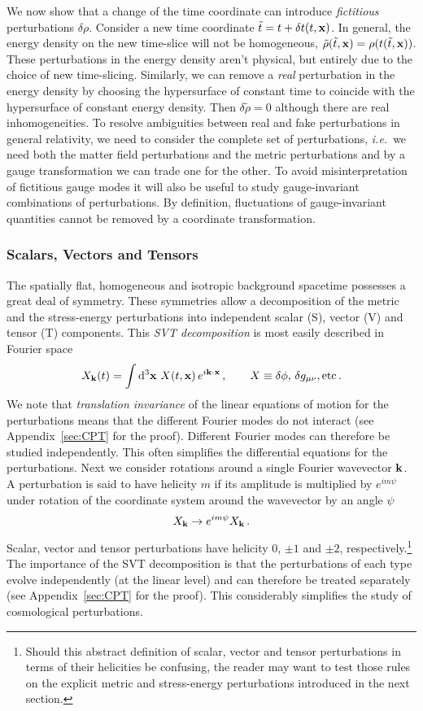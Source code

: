 \documentclass[12pt,letterpaper,rotate]{article}
\def\beq{\begin{equation}}
\def\eeq{\end{equation}}
\def\d{{\rm d}}
\begin{document}
{We now show that a change of the time coordinate can introduce {\it fictitious} perturbations $\delta \rho$. Consider a new time coordinate $\tilde t = t + \delta t(t, {\bf x})$. In general, the energy density on the new time-slice will not be homogeneous, $\tilde \rho(\tilde t, {\bf x})= \rho(t(\tilde t, {\bf x}))$. These perturbations in the energy density aren't physical, but entirely due to the choice of new time-slicing.
Similarly, we can remove a {\it real} perturbation in the energy density by choosing the hypersurface of constant time to coincide with the hypersurface of constant energy density. Then $\delta \tilde \rho=0$ although there are real inhomogeneities.
To resolve ambiguities between real and fake perturbations in general relativity, we need to consider the complete set of perturbations, {\it i.e.}~we need both the matter field perturbations and the metric perturbations and by a gauge transformation we can trade one for the other.
To avoid misinterpretation of fictitious gauge modes it will also be useful to study
 gauge-invariant combinations of perturbations. By definition, fluctuations of gauge-invariant quantities cannot be removed by a coordinate transformation.


\subsubsection{Scalars, Vectors and Tensors}
The spatially flat, homogeneous and isotropic background spacetime possesses a great deal of symmetry. These
symmetries allow a decomposition of the metric and the stress-energy perturbations 
into independent scalar (S), vector (V) and tensor (T) components. This {\it SVT decomposition} is most easily described in
Fourier space \beq
 X_{\bf k}(t) = \int \d^3 {\bf x} \  X(t, {\bf x}) \, e^{i {\bf k} \cdot {\bf x}}\, , \qquad X \equiv \delta \phi,\, \delta g_{\mu \nu}, {\rm etc}\, .
\eeq We note that {\it translation invariance} of the linear equations of motion for the perturbations means that
the different Fourier modes do not interact (see Appendix~\ref{sec:CPT} for the proof). 
Different Fourier modes can therefore be studied independently. This often simplifies the differential equations for the perturbations.
Next we consider rotations around a single Fourier wavevector ${\bf
k}$. A perturbation is said to have helicity $m$ if its amplitude is multiplied by $e^{i m \psi}$ under rotation
of the coordinate system around the wavevector by an angle $\psi$ \beq X_{\bf k} \to e^{im \psi} X_{\bf k}\, .
\eeq Scalar, vector and tensor perturbations have helicity $0$, $\pm 1$ and $\pm 2$, respectively.\footnote{Should this abstract definition of scalar, vector and tensor perturbations in terms of their helicities be confusing, the reader may want to test those rules on the explicit metric and stress-energy perturbations introduced in the next section.} The
importance of the SVT decomposition is that the perturbations of each type evolve independently (at the linear level) and can
therefore be treated separately (see Appendix~\ref{sec:CPT} for the proof).
This considerably simplifies the study of cosmological perturbations.

}
\end{document}
